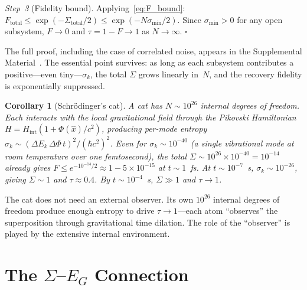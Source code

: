 \documentclass[prl,twocolumn,superscriptaddress,longbibliography,floatfix]{revtex4-2}
\newtheorem{corollary}[theorem]{Corollary}
\newcommand{\tauasym}{\tau}
\begin{document}
\emph{Step~3} (Fidelity bound).  Applying~\eqref{eq:F_bound}:
$F_{\mathrm{total}} \leq \exp(-\Sigma_{\mathrm{total}}/2)
\leq \exp(-N\sigma_{\min}/2)$.  Since $\sigma_{\min} > 0$ for
any open subsystem, $F \to 0$ and
$\tauasym = 1 - F \to 1$ as $N \to \infty$.
\hfill$\square$

The full proof, including the case of correlated noise, appears
in the Supplemental Material~\cite{SM}.  The essential point
survives: as long as each subsystem contributes a positive---even
tiny---$\sigma_k$, the total $\Sigma$ grows linearly in~$N$,
and the recovery fidelity is exponentially suppressed.

\begin{corollary}[Schr\"{o}dinger's cat]
\label{cor:cat}
A cat has $N \sim 10^{26}$ internal degrees of freedom.  Each
interacts with the local gravitational field through the
Pikovski Hamiltonian~\cite{Pikovski2015}
$H = H_{\mathrm{int}}(1 + \Phi(\hat{x})/c^2)$, producing
per-mode entropy $\sigma_k \sim (\Delta E_k\,\Delta\Phi\,t)^2
/(\hbar c^2)^2$.  Even for $\sigma_k \sim 10^{-40}$ (a single
vibrational mode at room temperature over one femtosecond), the total
$\Sigma \sim 10^{26} \times 10^{-40} = 10^{-14}$ already gives
$F \leq e^{-10^{-14}/2} \approx 1 - 5 \times 10^{-15}$ at
$t \sim 1$~fs.  At $t \sim 10^{-7}$~s,
$\sigma_k \sim 10^{-26}$, giving
$\Sigma \sim 1$ and $\tauasym \approx 0.4$.  By
$t \sim 10^{-4}$~s, $\Sigma \gg 1$ and $\tauasym \to 1$.
\end{corollary}

The cat does not need an external observer.  Its own $10^{26}$
internal degrees of freedom produce enough entropy to drive
$\tauasym \to 1$---each atom ``observes'' the superposition through
gravitational time dilation.  The role of the ``observer'' is played
by the extensive internal environment.

\section{The \texorpdfstring{$\Sigma$--$E_G$}{Sigma--E\_G} Connection}
\label{sec:EG}
\end{document}
